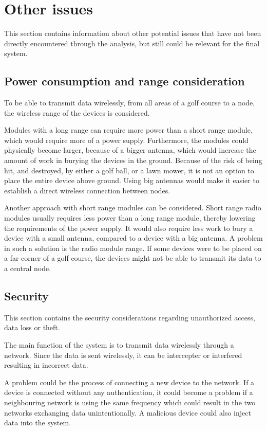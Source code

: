 \section{Other issues}
This section contains information about other potential issues that have not been directly encountered through the analysis, but still could be relevant for the final system.

\subsection{Power consumption and range consideration} \label{cha:batcons}
To be able to transmit data wirelessly, from all areas of a golf course to a node, the wireless range of the devices is considered.

Modules with a long range can require more power than a short range module, which would require more of a power supply. Furthermore, the modules could physically become larger, because of a bigger antenna, which would increase the amount of work in burying the devices in the ground. Because of the risk of being hit, and destroyed, by either a golf ball, or a lawn mower, it is not an option to place the entire device above ground. Using big antennas would make it easier to establish a direct wireless connection between nodes.

Another approach with short range modules can be considered. Short range radio modules usually requires less power than a long range module, thereby lowering the requirements of the power supply. It would also require less work to bury a device with a small antenna, compared to a device with a big antenna. A problem in such a solution is the radio module range. If some devices were to be placed on a far corner of a golf course, the devices might not be able to transmit its data to a central node. 

\subsection{Security}
This section contains the security considerations regarding unauthorized access, data loss or theft.

The main function of the system is to transmit data wirelessly through a network. Since the data is sent wirelessly, it can be intercepter or interfered resulting in incorrect data.

A problem could be the process of connecting a new device to the network. If a device is connected without any authentication, it could become a problem if a neighbouring network is using the same frequency which could result in the two networks exchanging data unintentionally. A malicious device could also inject data into the system.

